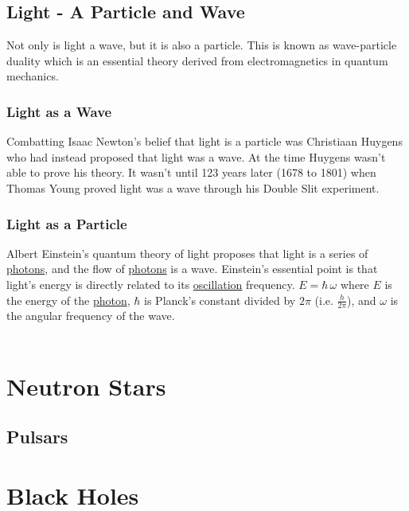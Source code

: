 \documentclass{article}
\begin{document}
\subsection{Light - A Particle and Wave}
Not only is light a wave, but it is also a particle. This is known as wave-particle duality which is an essential theory derived from electromagnetics in quantum mechanics.

\subsubsection{Light as a Wave}
Combatting Isaac Newton's belief that light is a particle was Christiaan Huygens who had instead proposed that light was a wave. At the time Huygens wasn't able to prove his theory. It wasn't until 123 years later (1678 to 1801) when Thomas Young proved light was a wave through his Double Slit experiment.

\subsubsection{Light as a Particle}
Albert Einstein's quantum theory of light proposes that light is a series of \hyperref[sec:photons]{photons}, and the flow of \hyperref[sec:photons]{photons} is a wave. Einstein's essential point is that light's energy is directly related to its \hyperref[sec:oscillation]{oscillation} frequency. $E = \hbar\,\omega$ where $E$ is the energy of the \hyperref[sec:photons]{photon}, $\hbar$ is Planck's constant divided by $2\pi$ (i.e. $\frac{h}{2\pi}$), and $\omega$ is the angular frequency of the wave.\\\\


\section{Neutron Stars}

\subsection{Pulsars}



\section{Black Holes}
\end{document}
